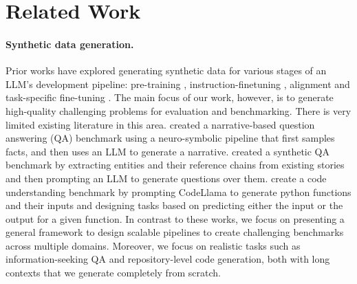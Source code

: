 \section{Related Work}
\paragraph{Synthetic data generation.} Prior works have explored generating synthetic data for various stages of an LLM's development pipeline: pre-training \citep{phi, cosmopedia}, instruction-finetuning \citep{wang-etal-2023-self-instruct, xu2024wizardlm}, alignment \citep{bai2022constitutionalaiharmlessnessai,leerlaif} and task-specific fine-tuning \citep{pmlr-v235-wei24h, yu2024metamath}. The main focus of our work, however, is to generate high-quality challenging problems for evaluation and benchmarking. There is very limited existing literature in this area. \citet{sprague2024musr} created a narrative-based question answering (QA) benchmark using a neuro-symbolic pipeline that first samples facts, and then uses an LLM to generate a narrative. \citet{bohnet2024longspanquestionansweringautomaticquestion} created a synthetic QA benchmark by extracting entities and their reference chains from existing stories and then prompting an LLM to generate questions over them. \citet{gu2024cruxevalbenchmarkcodereasoning} create a code understanding benchmark by prompting CodeLlama \citep{rozière2024codellamaopenfoundation} to generate python functions and their inputs and designing tasks based on predicting either the input or the output for a given function. In contrast to these works, we focus on presenting a general framework to design scalable pipelines to create challenging benchmarks across multiple domains. Moreover, we focus on realistic tasks such as information-seeking QA and repository-level code generation, both with long contexts that we generate completely from scratch.

